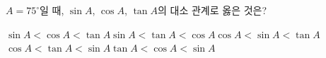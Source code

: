 $A=75^\circ$일 때, $\sin A$, $\cos A$, $\tan A$의 대소 관계로 옳은 것은?
\begin{choicesv}{$\sin A<\cos A<\tan A$}{$\sin A<\tan A<\cos A$}{$\cos A<\sin A<\tan A$}{$\cos A<\tan A<\sin A$}{$\tan A<\cos A<\sin A$}\end{choicesv}
